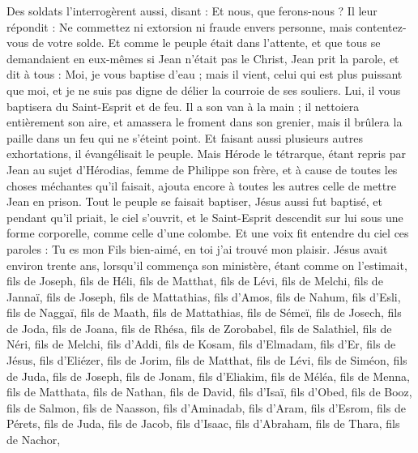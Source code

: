 \begin{multicols}{2}
Des soldats l'interrogèrent aussi, disant : Et nous, que ferons-nous ? Il leur répondit : Ne commettez ni extorsion ni fraude envers personne, mais contentez-vous de votre solde.
Et comme le peuple était dans l'attente, et que tous se demandaient en eux-mêmes si Jean n'était pas le Christ,
Jean prit la parole, et dit à tous : Moi, je vous baptise d'eau ; mais il vient, celui qui est plus puissant que moi, et je ne suis pas digne de délier la courroie de ses souliers. Lui, il vous baptisera du Saint-Esprit et de feu.
Il a son van à la main ; il nettoiera entièrement son aire, et amassera le froment dans son grenier, mais il brûlera la paille dans un feu qui ne s'éteint point.
Et faisant aussi plusieurs autres exhortations, il évangélisait le peuple.
Mais Hérode le tétrarque, étant repris par Jean au sujet d'Hérodias, femme de Philippe son frère, et à cause de toutes les choses méchantes qu’il faisait,
ajouta encore à toutes les autres celle de mettre Jean en prison.
Tout le peuple se faisait baptiser, Jésus aussi fut baptisé, et pendant qu’il priait, le ciel s'ouvrit,
et le Saint-Esprit descendit sur lui sous une forme corporelle, comme celle d'une colombe. Et une voix fit entendre du ciel ces paroles : Tu es mon Fils bien-aimé, en toi j’ai trouvé mon plaisir.
Jésus avait environ trente ans, lorsqu’il commença son ministère, étant comme on l’estimait, fils de Joseph, fils de Héli,
fils de Matthat, fils de Lévi, fils de Melchi, fils de Jannaï, fils de Joseph,
fils de Mattathias, fils d'Amos, fils de Nahum, fils d'Esli, fils de Naggaï,
fils de Maath, fils de Mattathias, fils de Sémeï, fils de Josech, fils de Joda,
fils de Joana, fils de Rhésa, fils de Zorobabel, fils de Salathiel, fils de Néri,
fils de Melchi, fils d'Addi, fils de Kosam, fils d'Elmadam, fils d'Er,
fils de Jésus, fils d'Eliézer, fils de Jorim, fils de Matthat, fils de Lévi,
fils de Siméon, fils de Juda, fils de Joseph, fils de Jonam, fils d'Eliakim,
fils de Méléa, fils de Menna, fils de Matthata, fils de Nathan, fils de David,
fils d’Isaï, fils d'Obed, fils de Booz, fils de Salmon, fils de Naasson,
fils d'Aminadab, fils d'Aram, fils d'Esrom, fils de Pérets, fils de Juda,
fils de Jacob, fils d'Isaac, fils d'Abraham, fils de Thara, fils de Nachor,

\end{multicols}
